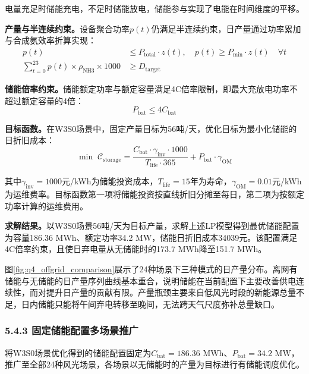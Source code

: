 \documentclass[zihao=-4,a4paper]{ctexart} %
\begin{document}
	电量充足时储能充电，不足时储能放电，储能参与实现了电能在时间维度的平移。
	
	\textbf{产量与半连续约束。}设备聚合功率$p(t)$仍满足半连续约束，日产量通过功率累加与合成氨效率折算实现：
	\begin{align}
		p(t) &\leq P_{\text{total}} \cdot z(t), \quad p(t) \geq P_{\min} \cdot z(t) \quad \forall t \label{eq:q4_semi} \\
		\sum_{t=0}^{23} p(t) \times \rho_{\text{NH3}} \times 1000 &\geq D_{\text{target}} \label{eq:q4_prod}
	\end{align}
	
	\textbf{储能倍率约束。}储能额定功率与额定容量满足4C倍率限制，即最大充放电功率不超过额定容量的4倍：
	\begin{equation}
		P_{\text{bat}} \leq 4 C_{\text{bat}}
		\label{eq:q4_crate}
	\end{equation}
	
	\textbf{目标函数。}在W3S0场景中，固定产量目标为56吨/天，优化目标为最小化储能的日折旧成本：
	\begin{equation}
		\min \; \mathcal{C}_{\text{storage}} = \frac{C_{\text{bat}} \cdot \gamma_{\text{inv}} \cdot 1000}{T_{\text{life}} \cdot 365} + P_{\text{bat}} \cdot \gamma_{\text{OM}}
		\label{eq:q4_obj}
	\end{equation}
	
	其中$\gamma_{\text{inv}}=1000$元/kWh为储能投资成本，$T_{\text{life}}=15$年为寿命，$\gamma_{\text{OM}}=0.01$元/kWh为运维费率。目标函数第一项将储能投资按直线折旧分摊至每日，第二项为按额定功率计算的运维费用。
	
	\textbf{求解结果。}以W3S0场景56吨/天为目标产量，求解上述LP模型得到最优储能配置为容量186.36 MWh、额定功率34.2 MW，储能日折旧成本34039元。该配置满足4C倍率约束，且使日弃电量从无储能时的173.7 MWh降至151.7 MWh。
	
	图\ref{fig:q4_offgrid_comparison}展示了24种场景下三种模式的日产量分布。离网有储能与无储能的日产量序列曲线基本重合，说明储能在当前配置下主要改善供电连续性，而对提升日产量的贡献有限。产量瓶颈主要来自低风光时段的新能源总量不足，日内储能只能将午间弃电转移至晚间，无法跨天气尺度弥补总量缺口。
	
	\subsubsection*{5.4.3 固定储能配置多场景推广}
	
	将W3S0场景优化得到的储能配置固定为$C_{\text{bat}}=186.36$ MWh、$P_{\text{bat}}=34.2$ MW，推广至全部24种风光场景，各场景以无储能时的产量为目标进行有储能调度优化。
	
\end{document}
